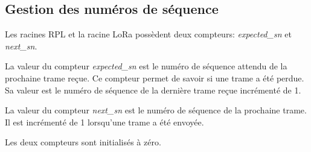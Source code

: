 
\subsection*{Gestion des numéros de séquence}
    Les racines RPL et la racine LoRa possèdent deux compteurs: \textit{expected\_sn} et \textit{next\_sn}.

    La valeur du compteur \textit{expected\_sn} est le numéro de séquence attendu de la prochaine trame reçue. Ce compteur permet de savoir si une trame a été perdue. Sa valeur est le numéro de séquence de la dernière trame reçue incrémenté de 1.

    La valeur du compteur \textit{next\_sn} est le numéro de séquence de la prochaine trame. Il est incrémenté de 1 lorsqu'une trame a été envoyée.

    Les deux compteurs sont initialisés à zéro.


